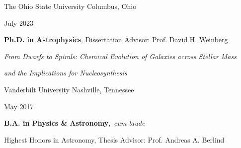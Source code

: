 \documentclass[cv.tex]{subfiles}
\begin{document}
{\color{themecolor}\large The Ohio State University}
\hfill
Columbus, Ohio
\par\noindent
\parbox{0.18\textwidth}{%
	\raggedleft
	July 2023 \par
	\null \par
	\null
}
\hspace{1mm}
\parbox{0.8\textwidth}{%
	\textbf{Ph.D. in Astrophysics}, Dissertation Advisor: Prof. David H. Weinberg
	\par
	\textit{From Dwarfs to Spirals: Chemical Evolution of
	Galaxies across Stellar Mass} \par
	\textit{and the Implications for Nucleosynthesis} \par
}
\vspace{2mm}
\par\noindent
{\color{themecolor}\large Vanderbilt University}
\hfill
Nashville, Tennessee
\par\noindent
\parbox{0.18\textwidth}{%
	\raggedleft
	May 2017 \par
	\null
}
\hspace{1mm}
\parbox{0.8\textwidth}{%
	\vspace{1mm}
	\textbf{B.A. in Physics \& Astronomy},~\textit{cum laude} \par
	Highest Honors in Astronomy, Thesis Advisor: Prof. Andreas A. Berlind
}
\end{document}
